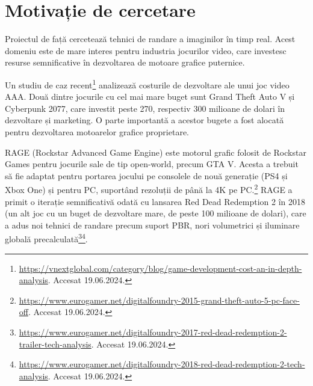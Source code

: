 \documentclass[12pt,a4paper]{report}
\numberwithin{equation}{section} %
\begin{document}
\chapter{\label{sec:motivatie}Motivație de cercetare}

Proiectul de față cercetează tehnici de randare a imaginilor în timp real. Acest
domeniu este de mare interes pentru industria jocurilor video, care investesc
resurse semnificative în dezvoltarea de motoare grafice puternice.

Un studiu de caz
recent\footnote{\label{vnextglobal}\url{https://vnextglobal.com/category/blog/game-development-cost-an-in-depth-analysis}. Accesat 19.06.2024.}
analizează costurile de dezvoltare ale unui joc video AAA. Două dintre jocurile
cu cel mai mare buget sunt Grand Theft Auto V și Cyberpunk 2077, care investit
peste 270, respectiv 300 milioane de dolari în dezvoltare și marketing. O parte
importantă a acestor bugete a fost alocată pentru dezvoltarea motoarelor grafice
proprietare.

RAGE (Rockstar Advanced Game Engine) este motorul grafic folosit
de Rockstar Games pentru jocurile sale de tip open-world, precum GTA V. Acesta a
trebuit să fie adaptat pentru portarea jocului pe consolele de nouă generație
(PS4 și Xbox One) și pentru PC, suportând rezoluții de până la 4K pe PC.\footnote{\url{https://www.eurogamer.net/digitalfoundry-2015-grand-theft-auto-5-pc-face-off}. Accesat 19.06.2024.}
RAGE a primit o iterație semnificativă odată cu lansarea Red Dead Redemption 2 în 2018
(un alt joc cu un buget de dezvoltare mare, de peste 100 milioane de dolari),
care a adus noi tehnici de randare precum suport PBR, nori volumetrici și iluminare globală
precalculată\footnote{\url{https://www.eurogamer.net/digitalfoundry-2017-red-dead-redemption-2-trailer-tech-analysis}. Accesat 19.06.2024.}\footnote{\url{https://www.eurogamer.net/digitalfoundry-2018-red-dead-redemption-2-tech-analysis}. Accesat 19.06.2024.}.
\end{document}
